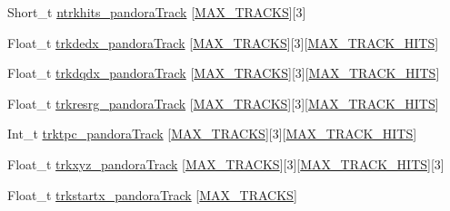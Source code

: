 \begin{DoxyCompactItemize}
\item 
Short\-\_\-t \hyperlink{classanatree_a5c339578d12ea63d45588d2ce9ef8313}{ntrkhits\-\_\-pandora\-Track} \mbox{[}\hyperlink{anatree__core__v09410002__orig_8h_a327fd4e796e4a0d78947524c96e4362e}{M\-A\-X\-\_\-\-T\-R\-A\-C\-K\-S}\mbox{]}\mbox{[}3\mbox{]}
\item 
Float\-\_\-t \hyperlink{classanatree_a62256c9cc8a24288464c9da99060549c}{trkdedx\-\_\-pandora\-Track} \mbox{[}\hyperlink{anatree__core__v09410002__orig_8h_a327fd4e796e4a0d78947524c96e4362e}{M\-A\-X\-\_\-\-T\-R\-A\-C\-K\-S}\mbox{]}\mbox{[}3\mbox{]}\mbox{[}\hyperlink{anatree__core__v09410002__orig_8h_ae75eb9050f16aa034339f05572523070}{M\-A\-X\-\_\-\-T\-R\-A\-C\-K\-\_\-\-H\-I\-T\-S}\mbox{]}
\item 
Float\-\_\-t \hyperlink{classanatree_aea4e01f3e29dc7c8b9ef4e91d5768b70}{trkdqdx\-\_\-pandora\-Track} \mbox{[}\hyperlink{anatree__core__v09410002__orig_8h_a327fd4e796e4a0d78947524c96e4362e}{M\-A\-X\-\_\-\-T\-R\-A\-C\-K\-S}\mbox{]}\mbox{[}3\mbox{]}\mbox{[}\hyperlink{anatree__core__v09410002__orig_8h_ae75eb9050f16aa034339f05572523070}{M\-A\-X\-\_\-\-T\-R\-A\-C\-K\-\_\-\-H\-I\-T\-S}\mbox{]}
\item 
Float\-\_\-t \hyperlink{classanatree_a95549a4120ced04bca8ddfed88f2ef36}{trkresrg\-\_\-pandora\-Track} \mbox{[}\hyperlink{anatree__core__v09410002__orig_8h_a327fd4e796e4a0d78947524c96e4362e}{M\-A\-X\-\_\-\-T\-R\-A\-C\-K\-S}\mbox{]}\mbox{[}3\mbox{]}\mbox{[}\hyperlink{anatree__core__v09410002__orig_8h_ae75eb9050f16aa034339f05572523070}{M\-A\-X\-\_\-\-T\-R\-A\-C\-K\-\_\-\-H\-I\-T\-S}\mbox{]}
\item 
Int\-\_\-t \hyperlink{classanatree_a398371428049d52930f2545c31a9e15e}{trktpc\-\_\-pandora\-Track} \mbox{[}\hyperlink{anatree__core__v09410002__orig_8h_a327fd4e796e4a0d78947524c96e4362e}{M\-A\-X\-\_\-\-T\-R\-A\-C\-K\-S}\mbox{]}\mbox{[}3\mbox{]}\mbox{[}\hyperlink{anatree__core__v09410002__orig_8h_ae75eb9050f16aa034339f05572523070}{M\-A\-X\-\_\-\-T\-R\-A\-C\-K\-\_\-\-H\-I\-T\-S}\mbox{]}
\item 
Float\-\_\-t \hyperlink{classanatree_a62e9898ef8a4d6bc9929f5e8c058ad25}{trkxyz\-\_\-pandora\-Track} \mbox{[}\hyperlink{anatree__core__v09410002__orig_8h_a327fd4e796e4a0d78947524c96e4362e}{M\-A\-X\-\_\-\-T\-R\-A\-C\-K\-S}\mbox{]}\mbox{[}3\mbox{]}\mbox{[}\hyperlink{anatree__core__v09410002__orig_8h_ae75eb9050f16aa034339f05572523070}{M\-A\-X\-\_\-\-T\-R\-A\-C\-K\-\_\-\-H\-I\-T\-S}\mbox{]}\mbox{[}3\mbox{]}
\item 
Float\-\_\-t \hyperlink{classanatree_ab465442cb1d2f550e8f2b702b0a04000}{trkstartx\-\_\-pandora\-Track} \mbox{[}\hyperlink{anatree__core__v09410002__orig_8h_a327fd4e796e4a0d78947524c96e4362e}{M\-A\-X\-\_\-\-T\-R\-A\-C\-K\-S}\mbox{]}

\end{DoxyCompactItemize}
